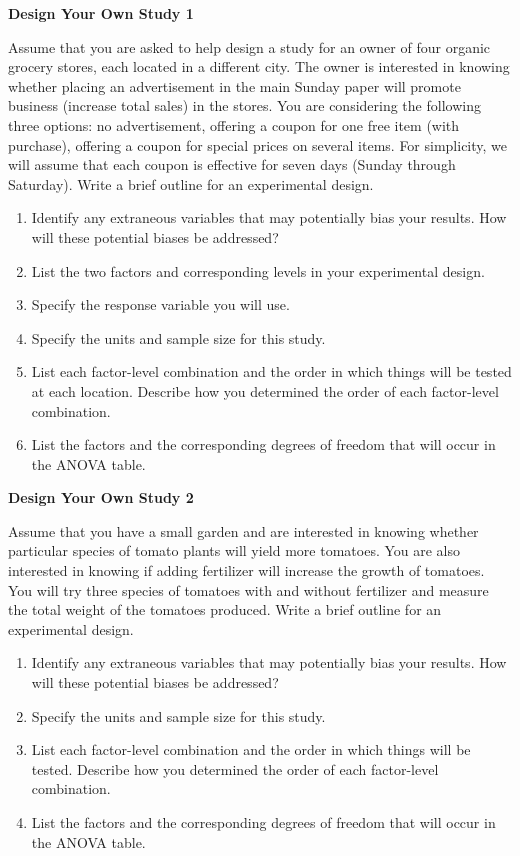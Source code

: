 \documentclass[
]{report}
\begin{document}
\begin{list}{E.}{ \setlength{\itemsep}{1.2em}}

  \item \textbf{Design Your Own Study 1}

Assume that you are asked to help design a study for an owner of four organic grocery stores, each located in a different city. The owner is interested in knowing whether placing an advertisement in the main Sunday paper will promote business (increase total sales) in the stores. You are considering the following three options: no advertisement, offering a coupon for one free item (with purchase), offering a coupon for special prices on several items. For simplicity, we will assume that each coupon is effective for seven days (Sunday through Saturday). Write a brief outline for an experimental design.
  \begin{enumerate}
    \item Identify any extraneous variables that may potentially bias your results. How will these potential biases be addressed?
    \item List the two factors and corresponding levels in your experimental design.
    \item Specify the response variable you will use.
    \item Specify the units and sample size for this study.
    \item List each factor-level combination and the order in which things will be tested at each location. Describe how you determined the order of each factor-level combination.
    \item List the factors and the corresponding degrees of freedom that will occur in the ANOVA table.
  \end{enumerate}

  \item \textbf{Design Your Own Study 2}

Assume that you have a small garden and are interested in knowing whether particular species of tomato plants will yield more tomatoes. You are also interested in knowing if adding fertilizer will increase the growth of tomatoes. You will try three species of tomatoes with and without fertilizer and measure the total weight of the tomatoes produced. Write a brief outline for an experimental design.
  \begin{enumerate}
    \item Identify any extraneous variables that may potentially bias your results. How will these potential biases be addressed?
    \item Specify the units and sample size for this study.
    \item List each factor-level combination and the order in which things will be tested. Describe how you determined the order of each factor-level combination.
    \item List the factors and the corresponding degrees of freedom that will occur in the ANOVA table.
  \end{enumerate}


\end{list}
\end{document}
